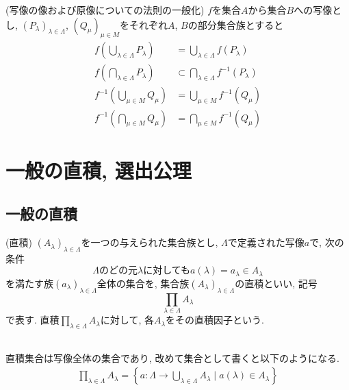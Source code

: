 \documentclass[a4j]{jsarticle}
\begin{document}
\begin{itembox}[l]{ (写像の像および原像についての法則の一般化)}
	$f$を集合$A$から集合$B$への写像とし, $(P_\lambda)_{\lambda \in \Lambda}$, $(Q_\mu)_{\mu \in M}$をそれぞれ$A$, $B$の部分集合族とすると
	\begin{align}
		f \left( \bigcup_{\lambda \in \Lambda}P_\lambda \right) & = \bigcup_{\lambda \in \Lambda}f(P_\lambda)            \\
		f \left( \bigcap_{\lambda \in \Lambda}P_\lambda \right) & \subset \bigcap_{\lambda \in \Lambda}f^{-1}(P_\lambda) \\
		f^{-1} \left( \bigcup_{\mu \in M}Q_\mu \right)          & = \bigcup_{\mu \in M}f^{-1}(Q_\mu)                     \\
		f^{-1} \left( \bigcap_{\mu \in M}Q_\mu \right)          & = \bigcap_{\mu \in M}f^{-1}(Q_\mu)
	\end{align}
\end{itembox}

\section{一般の直積, 選出公理}

\subsection{一般の直積}

\begin{itembox}[l]{ (直積)}
	$(A_\lambda)_{\lambda \in \Lambda}$を一つの与えられた集合族とし, $\Lambda$で定義された写像$a$で, 次の条件$$ \Lambda\mbox{のどの元}\lambda\mbox{に対しても}a(\lambda)=a_\lambda \in A_\lambda $$を満たす族$(a_\lambda)_{\lambda \in \Lambda}$全体の集合を, 集合族$(A_\lambda)_{\lambda \in \Lambda}$の直積といい, 記号$$\prod_{\lambda \in \Lambda}A_\lambda$$で表す. 直積$\prod_{\lambda \in \Lambda}A_\lambda$に対して, 各$A_\lambda$をその直積因子という.
\end{itembox}\\

 直積集合は写像全体の集合であり, 改めて集合として書くと以下のようになる.
\begin{align}
	\prod_{\lambda \in \Lambda}A_\lambda = \left\{ a: \Lambda \rightarrow \bigcup_{\lambda \in \Lambda}A_\lambda \mid a(\lambda) \in A_\lambda \right\}
\end{align}
\end{document}
